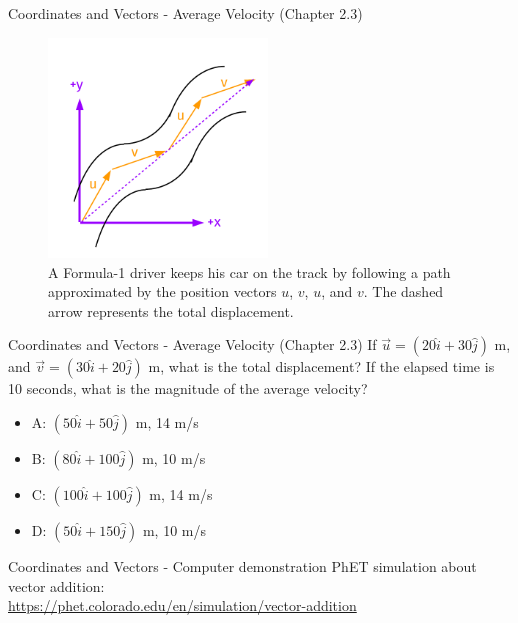 \documentclass{beamer}
\begin{document}
\begin{frame}{Coordinates and Vectors - Average Velocity (Chapter 2.3)}
\begin{figure}
\centering
\includegraphics[width=0.52\textwidth]{figures/AveVelocity.pdf}
\caption{\label{fig:avevel} A Formula-1 driver keeps his car on the track by following a path approximated by the position vectors $u$, $v$, $u$, and $v$.  The dashed arrow represents the total displacement.}
\end{figure}
\end{frame}

\begin{frame}{Coordinates and Vectors - Average Velocity (Chapter 2.3)}
If $\vec{u} = (20\hat{i}+30\hat{j})$ m, and $\vec{v} = (30\hat{i}+20\hat{j})$ m, what is the total displacement?  If the elapsed time is 10 seconds, what is the magnitude of the average velocity? \\
\vspace{0.2cm}
\begin{itemize}
\item A: $(50\hat{i} + 50\hat{j})$ m, 14 m/s
\item B: $(80\hat{i} + 100\hat{j})$ m, 10 m/s
\item C: $(100\hat{i} + 100\hat{j})$ m, 14 m/s
\item D: $(50\hat{i} + 150\hat{j})$ m, 10 m/s
\end{itemize}
\end{frame}

\begin{frame}{Coordinates and Vectors - Computer demonstration}
PhET simulation about vector addition: \\
\url{https://phet.colorado.edu/en/simulation/vector-addition}
\end{frame}
\end{document}

